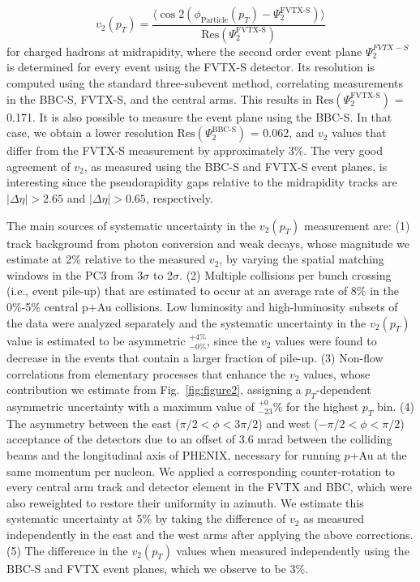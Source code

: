 \documentclass[%
reprint,
showpacs,preprintnumbers,
 amsmath,amssymb,
 aps,
]{revtex4-1}
\newcommand{\pt}{\mbox{$p_T$}\xspace}
\newcommand{\pau}{\mbox{$p$+Au}\xspace}
\begin{document}
\begin{equation}
v_{2}(p_{T}) = \frac{\langle \cos 2(\phi_{\text{Particle}}(p_{T})-\Psi^{\text{FVTX-S}}_{2})\rangle}{\text{Res}(\Psi^{\text{FVTX-S}}_{2})}
\end{equation}
for charged hadrons at midrapidity, where the second order event plane $\Psi^{FVTX-S}_{2}$ is determined for every event using the FVTX-S detector. Its resolution is computed using the standard three-subevent method, correlating measurements in the BBC-S, FVTX-S, and the central arms. This results in $\text{Res}(\Psi^{\text{FVTX-S}}_{2})$ = 0.171. It is also possible to measure the event plane using the BBC-S. In that case, we obtain a lower resolution $\text{Res}(\Psi^{\text{BBC-S}}_{2})$ = 0.062, and $v_2$ values that differ from the FVTX-S measurement by approximately 3\%. The very good agreement of $v_2$, as measured using the BBC-S and FVTX-S event planes, is interesting since the pseudorapidity gaps relative to the midrapidity tracks are $|\Delta\eta| > 2.65$ and $|\Delta\eta| > 0.65$, respectively.

The main sources of systematic uncertainty in the $v_2(p_T)$ measurement are: (1) track background from photon conversion and weak decays, whose magnitude we estimate at 2\% relative to the measured $v_2$, by varying the spatial matching windows in the PC3 from 3$\sigma$ to 2$\sigma$. (2) Multiple collisions per bunch crossing (i.e., event pile-up) that are estimated to occur  at an average rate of 8\% in the 0\%-5\% central p+Au collisions. Low luminosity and high-luminosity subsets of the data were analyzed separately and the systematic uncertainty in the $v_2(p_T)$ value is estimated to be asymmetric  $^{+4\%}_{-0\%}$, since the $v_2$  values were found to decrease in the events that contain a larger fraction of pile-up. (3) Non-flow correlations from elementary processes that enhance the $v_2$ values, whose contribution we estimate from Fig.~\ref{fig:figure2}, assigning a \pt-dependent asymmetric uncertainty with a maximum value of $^{+0}_{-23}\%$ for the highest \pt bin. (4) The asymmetry between the east ($\pi/2 < \phi < 3\pi/2$) and west ($-\pi/2 < \phi < \pi/2$) acceptance of the detectors due to an offset of 3.6 mrad between the colliding beams and the longitudinal axis of PHENIX, necessary for running \pau at the same momentum per nucleon. We applied a corresponding counter-rotation to every central arm track and detector element in the FVTX and BBC, which were also reweighted to restore their uniformity in azimuth. We estimate this systematic uncertainty at 5\% by taking the difference of $v_2$ as measured independently in the east and the west arms after applying the above corrections. (5) The difference in the $v_2(p_T)$ values when measured independently using the BBC-S and FVTX event planes, which we observe to be 3\%. 
\end{document}
